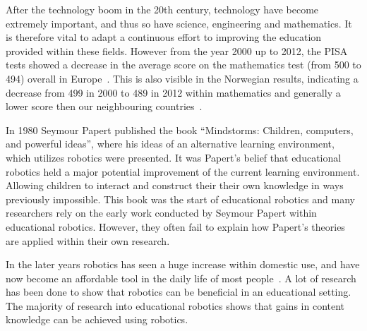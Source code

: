 After the technology boom in the 20th century, technology have become extremely important, and thus so have science, engineering and mathematics. It is therefore vital to adapt a continuous effort to improving the education provided within these fields. However from the year 2000 up to 2012, the PISA tests showed a decrease in the average score on the mathematics test (from 500 to 494) overall in Europe~\cite{OECDPISA2000, OECDPISA2012}. This is also visible in the Norwegian results, indicating a decrease from 499 in 2000 to 489 in 2012 within mathematics and generally a lower score then our neighbouring countries~\cite{OECDPISA}.

\bigskip\noindent
In 1980 Seymour Papert published the book ``Mindstorms: Children, computers, and powerful ideas''\cite{papert1980mindstorms}, where his ideas of an alternative 
learning environment, which utilizes robotics were presented. It was Papert's belief that educational robotics held a major potential improvement of the current learning environment.
Allowing children to interact and construct their their own knowledge in ways previously impossible. 
This book was the start of educational robotics and many researchers rely on the early work conducted by Seymour Papert within educational robotics. However, they often fail to explain how Papert's theories are applied within their own research. 

\bigskip\noindent
In the later years robotics has seen a huge increase within domestic use, and have now become an affordable tool in the daily life of most people~\cite{kara2003sizing,hsiu2003designing}.
A lot of research has been done to show that robotics can be beneficial in an educational setting.
The majority of research into educational robotics shows that gains in content knowledge can be achieved using robotics.






